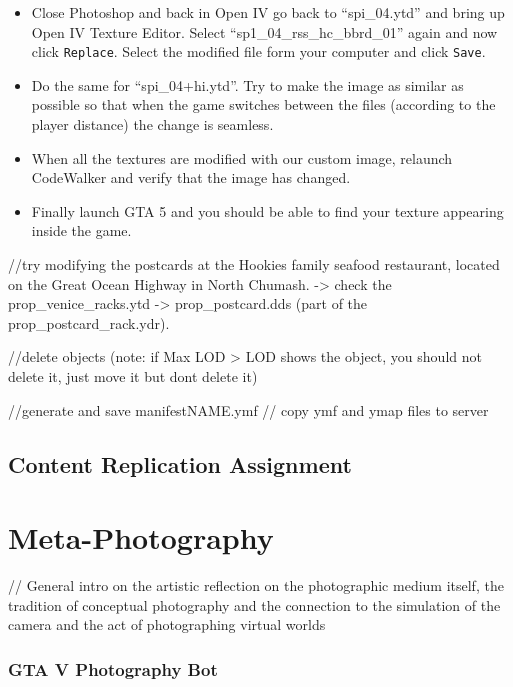 \documentclass[
  openany]{book}
\begin{document}
\begin{itemize}
\item
  Close Photoshop and back in Open IV go back to ``spi\_04.ytd'' and bring up Open IV Texture Editor. Select ``sp1\_04\_rss\_hc\_bbrd\_01'' again and now click \texttt{Replace}. Select the modified file form your computer and click \texttt{Save}.
\item
  Do the same for ``spi\_04+hi.ytd''. Try to make the image as similar as possible so that when the game switches between the files (according to the player distance) the change is seamless.
\item
  When all the textures are modified with our custom image, relaunch CodeWalker and verify that the image has changed.
\item
  Finally launch GTA 5 and you should be able to find your texture appearing inside the game.
\end{itemize}

//try modifying the postcards at the Hookies family seafood restaurant, located on the Great Ocean Highway in North Chumash. -\textgreater{} check the prop\_venice\_racks.ytd -\textgreater{} prop\_postcard.dds (part of the prop\_postcard\_rack.ydr).

//delete objects (note: if Max LOD \textgreater{} LOD shows the object, you should not delete it, just move it but dont delete it)

//generate and save manifestNAME.ymf // copy ymf and ymap files to server

\hypertarget{content-replication-assignment-6}{%
\section*{Content Replication Assignment}\label{content-replication-assignment-6}}

\hypertarget{meta-photography}{%
\chapter{Meta-Photography}\label{meta-photography}}

// General intro on the artistic reflection on the photographic medium itself, the tradition of conceptual photography and the connection to the simulation of the camera and the act of photographing virtual worlds

\hypertarget{gta-v-photography-bot}{%
\subsection*{GTA V Photography Bot}\label{gta-v-photography-bot}}
\end{document}
